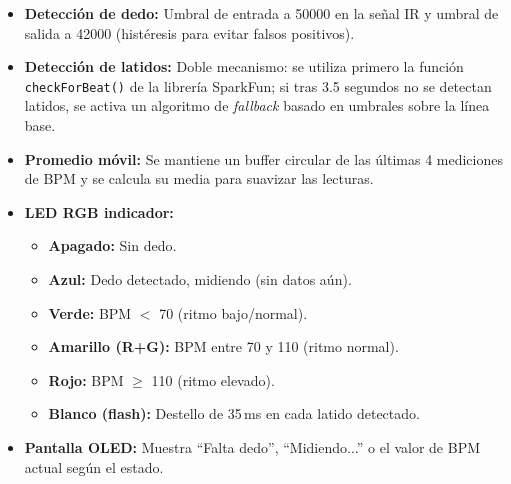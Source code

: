 \documentclass[11pt,a4paper]{article}
\begin{document}
\begin{itemize}
    \item \textbf{Detección de dedo:} Umbral de entrada a 50000 en la señal IR y umbral de salida a 42000 (histéresis para evitar falsos positivos).
    \item \textbf{Detección de latidos:} Doble mecanismo: se utiliza primero la función \texttt{checkForBeat()} de la librería SparkFun; si tras 3.5 segundos no se detectan latidos, se activa un algoritmo de \textit{fallback} basado en umbrales sobre la línea base.
    \item \textbf{Promedio móvil:} Se mantiene un buffer circular de las últimas 4 mediciones de BPM y se calcula su media para suavizar las lecturas.
    \item \textbf{LED RGB indicador:}
    \begin{itemize}
        \item \textbf{Apagado:} Sin dedo.
        \item \textbf{Azul:} Dedo detectado, midiendo (sin datos aún).
        \item \textbf{Verde:} BPM $<$ 70 (ritmo bajo/normal).
        \item \textbf{Amarillo (R+G):} BPM entre 70 y 110 (ritmo normal).
        \item \textbf{Rojo:} BPM $\geq$ 110 (ritmo elevado).
        \item \textbf{Blanco (flash):} Destello de 35\,ms en cada latido detectado.
    \end{itemize}
    \item \textbf{Pantalla OLED:} Muestra ``Falta dedo'', ``Midiendo...'' o el valor de BPM actual según el estado.
\end{itemize}
\end{document}
